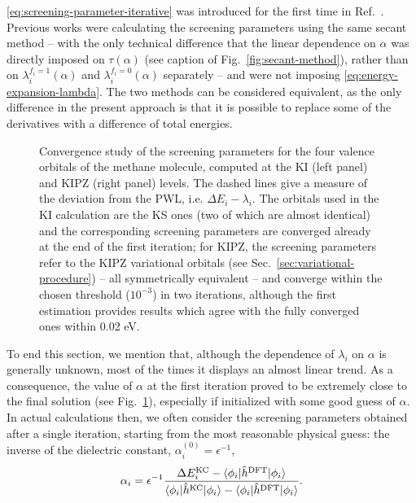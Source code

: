 \cref{eq:screening-parameter-iterative} was introduced for the first time in Ref.~\cite{nguyen_koopmans-compliant_2018}. Previous works were calculating the screening parameters using the same secant method -- with the only technical difference that the linear dependence on $\alpha$ was directly imposed on $\tau(\alpha)$ (see caption of Fig.~\ref{fig:secant-method}), rather than on $\lambda_i^{f_i=1}(\alpha)$ and $\lambda_i^{f_i=0}(\alpha)$ separately -- and were not imposing \cref{eq:energy-expansion-lambda}. The two methods can be considered equivalent, as the only difference in the present approach is that it is possible to replace some of the derivatives with a difference of total energies.

\begin{figure}
    \centering
     \qquad
    \caption[Convergence of screening parameters]{Convergence study of the screening parameters for the four valence orbitals of the methane molecule, computed at the KI (left panel) and KIPZ (right panel) levels. The dashed lines give a measure of the deviation from the PWL, i.e. $\Delta E_i - \lambda_i$. The orbitals used in the KI calculation are the KS ones (two of which are almost identical) and the corresponding screening parameters are converged already at the end of the first iteration; for KIPZ, the screening parameters refer to the KIPZ variational orbitals (see Sec.~\ref{sec:variational-procedure}) -- all symmetrically equivalent -- and converge within the chosen threshold ($10^{-3}$) in two iterations, although the first estimation provides results which agree with the fully converged ones within 0.02 eV.}
    \label{fig:alphas-convergence}
\end{figure}

To end this section, we mention that, although the dependence of $\lambda_i$ on $\alpha$ is generally unknown, most of the times it displays an almost linear trend. As a consequence, the value of $\alpha$ at the first iteration proved to be extremely close to the final solution (see Fig.~\ref{fig:alphas-convergence}), especially if initialized with some good guess of $\alpha$. In actual calculations then, we often consider the screening parameters obtained after a single iteration, starting from the most reasonable physical guess: the inverse of the dielectric constant, $\alpha_i^{(0)} = \epsilon^{-1}$,
%
\begin{equation}
    \alpha_i = \epsilon^{-1} \frac{\Delta E^{\rm KC}_i - \braket{\phi_i|\hat{h}^{\rm DFT}|\phi_i}}{\braket{\phi_i|\hat{h}^{\rm KC}|\phi_i} - \braket{\phi_i|\hat{h}^{\rm DFT}|\phi_i}} .
    \label{eq:screening-parameter-dscf}
\end{equation}

